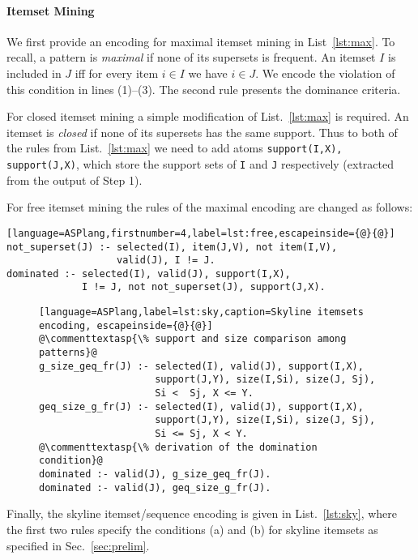 \paragraph{Itemset Mining} We first provide an encoding for maximal itemset mining in List~\ref{lst:max}. To recall, a pattern is \emph{maximal} if none of its supersets is frequent. An itemset $I$ is included in $J$ iff for every item $i\in I$ we have  $i\in J$. We encode the violation of this condition in lines (1)--(3). The second rule presents the dominance criteria.

For closed itemset mining a simple modification of List.~\ref{lst:max} is required. An itemset is \emph{closed} if none of its supersets has the same support. Thus to both of the rules from List.~\ref{lst:max} we need to add atoms \texttt{support(I,X), support(J,X)}, which store the support sets of \texttt{I} and \texttt{J} respectively (extracted from the output of Step 1).  


For free itemset mining the rules of the maximal encoding are changed as follows:
\medskip

\small{\begin{lstlisting}[language=ASPlang,firstnumber=4,label=lst:free,escapeinside={@}{@}]
not_superset(J) :- selected(I), item(J,V), not item(I,V), 
                   valid(J), I != J.
dominated :- selected(I), valid(J), support(I,X),
             I != J, not not_superset(J), support(J,X).
\end{lstlisting}}



\begin{figure}[t]
\small{\begin{lstlisting}[language=ASPlang,label=lst:sky,caption=Skyline itemsets encoding, escapeinside={@}{@}]
@\commenttextasp{\% support and size comparison among patterns}@
g_size_geq_fr(J) :- selected(I), valid(J), support(I,X), 
                    support(J,Y), size(I,Si), size(J, Sj), 
                    Si <  Sj, X <= Y. 
geq_size_g_fr(J) :- selected(I), valid(J), support(I,X), 
                    support(J,Y), size(I,Si), size(J, Sj), 
                    Si <= Sj, X < Y. 
@\commenttextasp{\% derivation of the domination condition}@
dominated :- valid(J), g_size_geq_fr(J). 
dominated :- valid(J), geq_size_g_fr(J). 
\end{lstlisting}}
\end{figure}
\normalsize{Finally, the skyline itemset/sequence encoding is given in List.~\ref{lst:sky}, where the first two rules specify the conditions (a) and (b) for skyline itemsets as specified in Sec.~\ref{sec:prelim}. }

